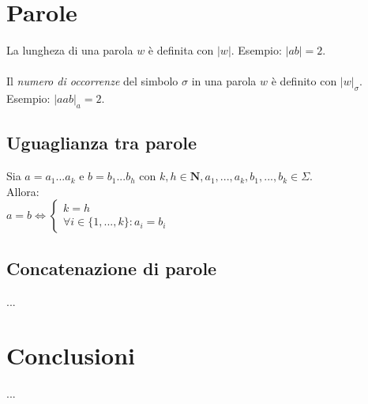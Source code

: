 \documentclass[]{article}
\begin{document}
\section{Parole}

La lungheza di una parola \mbox{$w$} è definita con \mbox{$|w|$}. Esempio: \mbox{$|ab|=2$}.
\\
\\
Il \textit{numero di occorrenze} del simbolo \mbox{$\sigma$} in una parola \mbox{$w$} è definito con \mbox{$|w|_\sigma$}. Esempio: \mbox{$|aab|_a=2$}.


\subsection{Uguaglianza tra parole}

Sia
\begin{math}
a = a_1...a_k
\end{math}
e
\begin{math}
b = b_1...b_h
\end{math}
con
\begin{math}
k, h \in \mathbf{N},
a_1, ..., a_k, b_1, ..., b_k \in \Sigma
\end{math}.
\\
Allora:
\\
\begin{math}
a=b
\Leftrightarrow
\begin{cases}
k = h \\
\forall i \in \{1, ..., k\} : a_i=b_i
\end{cases}
\end{math}


\subsection{Concatenazione di parole}

...


\section*{Conclusioni}

...
\end{document}
